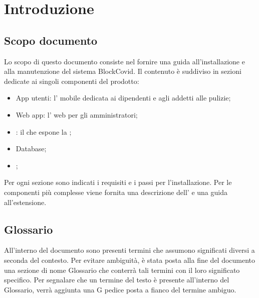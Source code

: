\section{Introduzione}

\subsection{Scopo documento}
Lo scopo di questo documento consiste nel fornire una guida all'installazione e alla manutenzione del sistema BlockCovid. Il contenuto è suddiviso in sezioni dedicate ai singoli componenti del prodotto:
\begin{itemize}
	\item App utenti: l' mobile dedicata ai dipendenti e agli addetti alle pulizie;
	\item Web app: l' web per gli amministratori;
	\item {}: il  che espone la ;
	\item Database;
	\item {};
\end{itemize}
Per ogni sezione sono indicati i requisiti e i passi per l'installazione. Per le componenti più complesse viene fornita una descrizione dell' e una guida all'estensione.

\subsection{Glossario}
All’interno del documento sono presenti termini che assumono significati diversi a seconda del contesto. Per evitare ambiguità, è stata posta alla fine del documento una sezione di nome Glossario che conterrà tali termini con il loro significato specifico. Per segnalare che un termine del testo è presente all’interno del Glossario, verrà aggiunta una G pedice posta a fianco del termine ambiguo.
